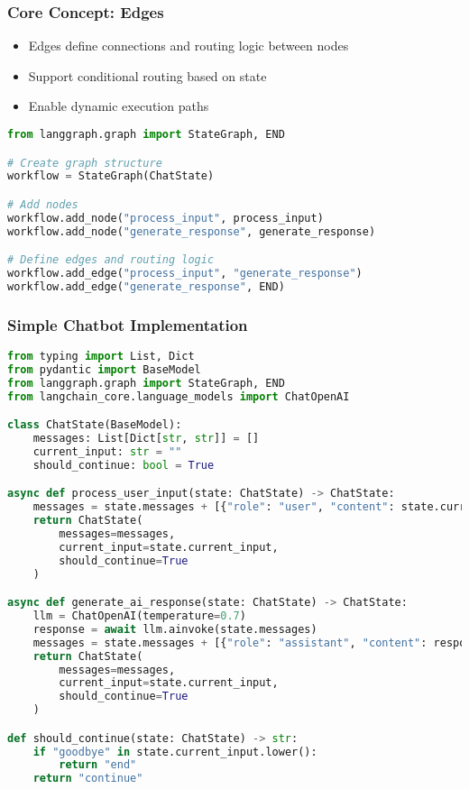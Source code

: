 \begin{frame}[fragile]\frametitle{Core Concept: Edges}

      \begin{itemize}
        \item Edges define connections and routing logic between nodes
        \item Support conditional routing based on state
        \item Enable dynamic execution paths
      \end{itemize}
	  
      \begin{lstlisting}[language=Python, basicstyle=\small]
from langgraph.graph import StateGraph, END

# Create graph structure
workflow = StateGraph(ChatState)

# Add nodes
workflow.add_node("process_input", process_input)
workflow.add_node("generate_response", generate_response)

# Define edges and routing logic
workflow.add_edge("process_input", "generate_response")
workflow.add_edge("generate_response", END)
      \end{lstlisting}

\end{frame}

\begin{frame}[fragile]\frametitle{Simple Chatbot Implementation}
      \begin{lstlisting}[language=Python, basicstyle=\tiny]
from typing import List, Dict
from pydantic import BaseModel
from langgraph.graph import StateGraph, END
from langchain_core.language_models import ChatOpenAI

class ChatState(BaseModel):
    messages: List[Dict[str, str]] = []
    current_input: str = ""
    should_continue: bool = True

async def process_user_input(state: ChatState) -> ChatState:
    messages = state.messages + [{"role": "user", "content": state.current_input}]
    return ChatState(
        messages=messages,
        current_input=state.current_input,
        should_continue=True
    )

async def generate_ai_response(state: ChatState) -> ChatState:
    llm = ChatOpenAI(temperature=0.7)
    response = await llm.ainvoke(state.messages)
    messages = state.messages + [{"role": "assistant", "content": response}]
    return ChatState(
        messages=messages,
        current_input=state.current_input,
        should_continue=True
    )

def should_continue(state: ChatState) -> str:
    if "goodbye" in state.current_input.lower():
        return "end"
    return "continue"
      \end{lstlisting}
\end{frame}

